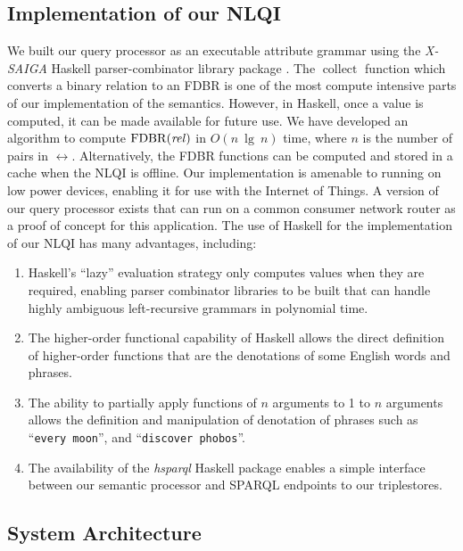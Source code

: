 \documentclass[../main.tex]{subfiles}
\begin{document}
\begin{refsection}
\section{Implementation of our NLQI}
\label{webist2019journal:implementation}
We built our query processor as an executable attribute grammar using the {\em X-SAIGA} Haskell parser-combinator library package \cite{xsaiga}.
The $\operatorname{collect}$ function which converts a binary relation to an FDBR is one of the most
compute intensive parts of our implementation of the semantics. However, in Haskell, once a value is
computed, it can be made available for future use. We have developed an algorithm to compute
$\operatorname{FDBR}({\operatorname{\mathit{rel}}})$ in $O(n\ \operatorname{lg}\ n)$ time, where $n$ is the number of pairs in $\rel$.
Alternatively, the FDBR functions can be computed and stored in a cache when the NLQI is offline.
Our implementation is amenable to running on low power devices, enabling it for use with the Internet of Things. A version of our query processor exists that can run on a common consumer network router as a proof of concept for this application.
The use of Haskell for the implementation of our NLQI has many advantages, including:
\begin{enumerate}
	\setlength\itemsep{0em}
	\item Haskell's ``lazy'' evaluation strategy only computes values when they are required, enabling parser combinator
	libraries to be built that can handle highly ambiguous left-recursive grammars in polynomial time.
	\item The higher-order functional capability of Haskell allows the direct definition of higher-order
	functions that are the denotations of some English words and phrases.
	\item The ability to partially apply functions of $n$ arguments to 1 to $n$ arguments allows the
	definition and manipulation of denotation of phrases such as ``\texttt{every moon}'', and ``\texttt{discover
	phobos}''.
	\item The availability of the \textit{hsparql} \cite{hsparql} Haskell package enables a simple interface between our semantic processor and SPARQL endpoints to our triplestores.
\end{enumerate}



\subsection{System Architecture}
\label{webist2019journal:architecture}


\end{refsection}
\end{document}
